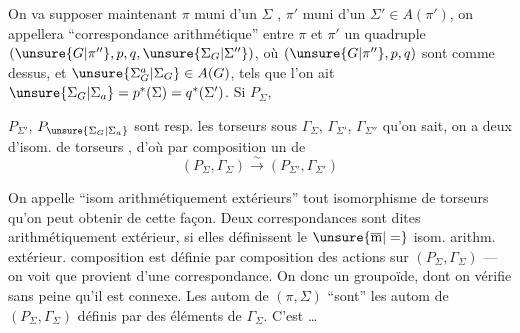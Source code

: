 
On va supposer maintenant $\pi$ muni d'un $\Sigma$ , $\pi'$ muni d'un $\Sigma'\in A(\pi')$, on appellera ``correspondance arithmétique'' entre $\pi$ et $\pi'$ un quadruple $(\unsure{G|\pi''},p,q,\unsure{\Sigma_G|\Sigma''})$, où $(\unsure{G|\pi''},p,q)$ sont comme dessus, et $\unsure{\Sigma_G^{a}|\Sigma_G}\in A(G)$, tels que l'on ait $\unsure{\Sigma_G|\Sigma_a}=p^*(\Sigma)=q^*(\Sigma')$.  Si $P_{\Sigma}$,

$P_{\Sigma'}$, $P_{\unsure{\Sigma_G|\Sigma_a}}$ sont resp. les torseurs sous $\Gamma_{\Sigma}$, $\Gamma_{\Sigma'}$, $\Gamma_{\Sigma''}$ qu'on sait, on a deux  d'isom. de torseurs
,
d'où par composition un  de
\[
(P_{\Sigma},\Gamma_{\Sigma})\xrightarrow{\sim}(P_{\Sigma'},\Gamma_{\Sigma'})
\]

On appelle ``isom arithmétiquement extérieurs''  tout isomorphisme de torseurs qu'on peut obtenir de cette façon. Deux correspondances sont dites   arithmétiquement extérieur, si elles définissent le $\unsure{\overline{\mathrm m}|=}$ isom. arithm. extérieur.  composition est définie par composition des actions sur $(P_{\Sigma},\Gamma_{\Sigma})$ --- on voit que  provient d'une correspondance. On  donc un groupoïde, dont on vérifie sans peine qu'il est connexe.  Les autom de $(\pi,\Sigma)$ ``sont'' les autom de $(P_{\Sigma},\Gamma_{\Sigma})$ définis par des éléments de $\Gamma_{\Sigma}$.  C'est \ldots

